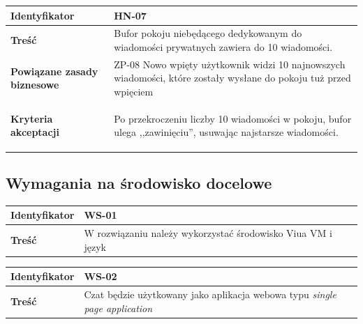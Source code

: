 \vspace{1em}

\begin{tabular}{ | l | l | }
	\hline
		\textbf{Identyfikator} &
		HN-07
		\\

	\hline
		\textbf{Treść} & \parbox[t]{11.5cm}{\strut
			Bufor pokoju niebędącego dedykowanym do wiadomości prywatnych zawiera do
      10 wiadomości.
		\strut}\\

	\hline
		\parbox[t]{4cm}{\textbf{Powiązane zasady biznesowe}} & \parbox[t]{11.5cm}{\strut
			ZP-08 Nowo wpięty użytkownik widzi 10 najnowszych wiadomości,
      które zostały wysłane do pokoju tuż przed wpięciem
		\strut}\\

	\hline
		\parbox[t]{4cm}{\textbf{Kryteria akceptacji}} & \parbox[t]{11.5cm}{\strut
			\begin{enumreq}
				\item Po przekroczeniu liczby 10 wiadomości w pokoju, bufor ulega
        ,,zawinięciu'', usuwając najstarsze wiadomości.
			\end{enumreq}
			\strut}
		\\

	\hline
\end{tabular}

\newpage

\subsection{Wymagania na środowisko docelowe}

\leavevmode\hbox{}

\begin{tabular}{ | l | l | }
	\hline
		\textbf{Identyfikator} &
	WS-01
		\\

	\hline
		\textbf{Treść} & \parbox[t]{13cm}{
			W rozwiązaniu należy wykorzystać środowisko Viua VM i
			język \ViuAct
		}\\

	\hline
\end{tabular}

\vspace{1em}

\begin{tabular}{ | l | l | }
	\hline
		\textbf{Identyfikator} &
	WS-02
		\\

	\hline
		\textbf{Treść} & \parbox[t]{13cm}{
			Czat będzie użytkowany jako aplikacja webowa typu
			\textit{single page application}
		}\\

	\hline
\end{tabular}

